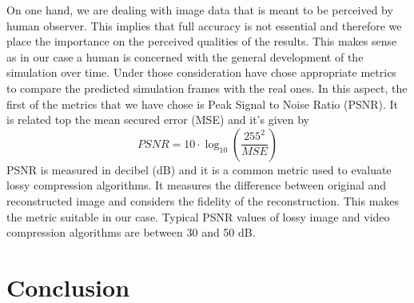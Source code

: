 \documentclass{llncs}
\begin{document}
On one hand, we are dealing with image data that is meant to be perceived by human observer. This implies that full accuracy is not essential and therefore we place the importance on the perceived qualities of the results. This makes sense as in our case a human is concerned with the general development of the simulation over time. Under those consideration have chose appropriate metrics to compare the predicted simulation frames with the real ones. In this aspect, the first of the metrics that we have chose is Peak Signal to Noise Ratio (PSNR). It is related top the mean secured error (MSE) and it's given by
\begin{equation}
PSNR = 10 \cdot \log_{10}\left(\frac{255^2}{MSE}\right)
\end{equation}
PSNR is measured in decibel (dB) and it is a common metric used to evaluate lossy compression algorithms. It measures the difference between original and reconstructed image and considers the fidelity of the reconstruction. This makes the metric suitable in our case. Typical PSNR values of lossy image and video compression  algorithms are between 30 and 50 dB. 

\section{Conclusion}\label{conclusion}



\clearpage


\end{document}
